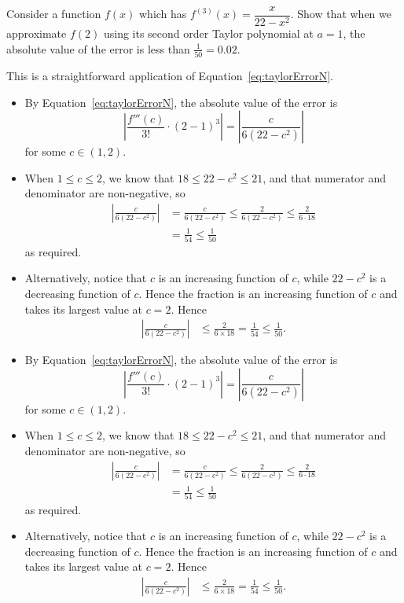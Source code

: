 \begin{question}[2015Q]
Consider a function $f(x)$ which has $f^{(3)}(x)=\dfrac{x}{22-x^2}$.  Show
that when we approximate $f(2)$ using its second order Taylor polynomial at $a=1$, the
absolute value of the error is less than $\frac{1}{50}=0.02$.
\end{question}
\begin{hint}
This is a straightforward application of Equation~\ref*{eq:taylorErrorN}.
\end{hint}
\begin{answer}
\begin{itemize}
 \item By  Equation~\ref*{eq:taylorErrorN}, the absolute value of the error is
\[\left|\frac{f'''(c)}{3!}\cdot (2-1)^3\right|
= \left|\frac{c}{6(22-c^2)}\right|\]
for some $c \in (1,2)$.
\item When $1\leq c\leq2$, we know that $18 \leq 22-c^2 \leq 21$, and that numerator and denominator are non-negative, so
\begin{align*}
\left|\frac{c}{6(22-c^2)}\right|
  &=\frac{c}{6(22-c^2)}
  \leq \frac{2}{6(22-c^2)}  \leq \frac{2}{6\cdot 18} \\
  & = \frac{1}{54} \leq \frac{1}{50}
\end{align*}
as required.

\item Alternatively, notice that $c$ is an increasing function of
$c$, while $22-c^2$ is a decreasing function of $c$. Hence the fraction is an
increasing function of $c$ and takes its largest value at $c=2$. Hence
\begin{align*}
\left|\frac{c}{6(22-c^2)}\right|
& \leq \frac{2}{6\times 18} = \frac{1}{54} \leq \frac{1}{50}.
\end{align*}
\end{itemize}
\end{answer}
\begin{solution}
\begin{itemize}
 \item By  Equation~\ref*{eq:taylorErrorN}, the absolute value of the error is
\[\left|\frac{f'''(c)}{3!}\cdot (2-1)^3\right|
= \left|\frac{c}{6(22-c^2)}\right|\]
for some $c \in (1,2)$.
\item When $1\leq c\leq2$, we know that $18 \leq 22-c^2 \leq 21$, and that numerator and denominator are non-negative, so
\begin{align*}
\left|\frac{c}{6(22-c^2)}\right|
  &=\frac{c}{6(22-c^2)}
  \leq \frac{2}{6(22-c^2)}  \leq \frac{2}{6\cdot 18} \\
  & = \frac{1}{54} \leq \frac{1}{50}
\end{align*}
as required.

\item Alternatively, notice that $c$ is an increasing function of
$c$, while $22-c^2$ is a decreasing function of $c$. Hence the fraction is an
increasing function of $c$ and takes its largest value at $c=2$. Hence
\begin{align*}
\left|\frac{c}{6(22-c^2)}\right|
& \leq \frac{2}{6\times 18} = \frac{1}{54} \leq \frac{1}{50}.
\end{align*}
\end{itemize}
\end{solution}
